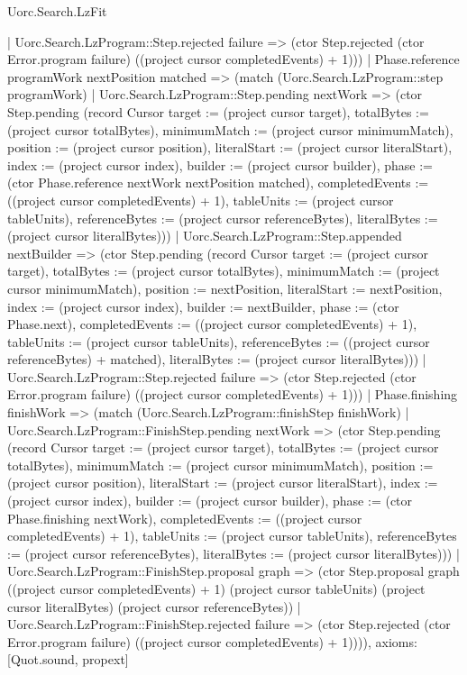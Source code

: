 \begin{lexlean}{Uorc.Search.LzFit}
\begin{semanticmodule}
{      | Uorc.Search.LzProgram::Step.rejected failure => (ctor Step.rejected (ctor Error.program failure) ((project cursor completedEvents) + 1)))
    | Phase.reference programWork nextPosition matched => (match (Uorc.Search.LzProgram::step programWork)
      | Uorc.Search.LzProgram::Step.pending nextWork => (ctor Step.pending (record Cursor {target := (project cursor target), totalBytes := (project cursor totalBytes), minimumMatch := (project cursor minimumMatch), position := (project cursor position), literalStart := (project cursor literalStart), index := (project cursor index), builder := (project cursor builder), phase := (ctor Phase.reference nextWork nextPosition matched), completedEvents := ((project cursor completedEvents) + 1), tableUnits := (project cursor tableUnits), referenceBytes := (project cursor referenceBytes), literalBytes := (project cursor literalBytes)}))
      | Uorc.Search.LzProgram::Step.appended nextBuilder => (ctor Step.pending (record Cursor {target := (project cursor target), totalBytes := (project cursor totalBytes), minimumMatch := (project cursor minimumMatch), position := nextPosition, literalStart := nextPosition, index := (project cursor index), builder := nextBuilder, phase := (ctor Phase.next), completedEvents := ((project cursor completedEvents) + 1), tableUnits := (project cursor tableUnits), referenceBytes := ((project cursor referenceBytes) + matched), literalBytes := (project cursor literalBytes)}))
      | Uorc.Search.LzProgram::Step.rejected failure => (ctor Step.rejected (ctor Error.program failure) ((project cursor completedEvents) + 1)))
    | Phase.finishing finishWork => (match (Uorc.Search.LzProgram::finishStep finishWork)
      | Uorc.Search.LzProgram::FinishStep.pending nextWork => (ctor Step.pending (record Cursor {target := (project cursor target), totalBytes := (project cursor totalBytes), minimumMatch := (project cursor minimumMatch), position := (project cursor position), literalStart := (project cursor literalStart), index := (project cursor index), builder := (project cursor builder), phase := (ctor Phase.finishing nextWork), completedEvents := ((project cursor completedEvents) + 1), tableUnits := (project cursor tableUnits), referenceBytes := (project cursor referenceBytes), literalBytes := (project cursor literalBytes)}))
      | Uorc.Search.LzProgram::FinishStep.proposal graph => (ctor Step.proposal graph ((project cursor completedEvents) + 1) (project cursor tableUnits) (project cursor literalBytes) (project cursor referenceBytes))
      | Uorc.Search.LzProgram::FinishStep.rejected failure => (ctor Step.rejected (ctor Error.program failure) ((project cursor completedEvents) + 1)))),
  axioms: [Quot.sound, propext]
}


\end{semanticmodule}
\end{lexlean}
